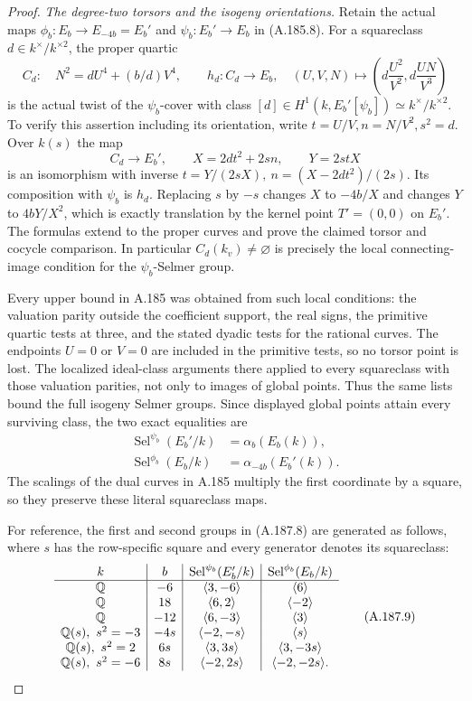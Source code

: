 \begin{proof}
\emph{The degree-two torsors and the isogeny orientations.}
Retain the actual maps
\(\phi_b:E_b\to E_{-4b}=E_b'\) and
\(\psi_b:E_b'\to E_b\) in (A.185.8).
For a squareclass \(d\in k^\times/k^{\times2}\), the
proper quartic
\[
 C_d:\quad N^2=dU^4+(b/d)V^4,
 \qquad
 h_d:C_d\longrightarrow E_b,
 \quad (U,V,N)\longmapsto
       \left(d\frac{U^2}{V^2},d\frac{UN}{V^3}\right)
\tag{A.187.6}
\]
is the actual twist of the \(\psi_b\)-cover with class
\([d]\in H^1(k,E_b'[\psi_b])\simeq k^\times/k^{\times2}\).
To verify this assertion including its orientation, write
\(t=U/V,n=N/V^2,s^2=d\).  Over \(k(s)\) the map
\[
 C_d\longrightarrow E_b',\qquad
 X=2dt^2+2sn,\qquad Y=2stX
\tag{A.187.7}
\]
is an isomorphism with inverse
\(t=Y/(2sX),\ n=(X-2dt^2)/(2s)\).
Its composition with \(\psi_b\) is \(h_d\).
Replacing \(s\) by \(-s\) changes \(X\) to
\(-4b/X\) and changes \(Y\) to \(4bY/X^2\),
which is exactly translation by the kernel point
\(T'=(0,0)\) on \(E_b'\).  The formulas extend to
the proper curves and prove the claimed torsor and cocycle
comparison.  In particular \(C_d(k_v)\ne\varnothing\)
is precisely the local connecting-image condition for
the \(\psi_b\)-Selmer group.

Every upper bound in A.185 was obtained from such local
conditions: the valuation parity outside the coefficient
support, the real signs, the primitive quartic tests at
three, and the stated dyadic tests for the rational curves.
The endpoints \(U=0\) or \(V=0\) are included in the
primitive tests, so no torsor point is lost.  The localized
ideal-class arguments there applied to every squareclass
with those valuation parities, not only to images of
global points.  Thus the same lists bound the full
isogeny Selmer groups.  Since displayed global points
attain every surviving class, the two exact equalities are
\[
\begin{aligned}
 \operatorname{Sel}^{\psi_b}(E_b'/k)
     &=\alpha_b(E_b(k)),\\
 \operatorname{Sel}^{\phi_b}(E_b/k)
     &=\alpha_{-4b}(E_b'(k)).
\end{aligned}
\tag{A.187.8}
\]
The scalings of the dual curves in A.185 multiply the
first coordinate by a square, so they preserve these
literal squareclass maps.

For reference, the first and second groups in (A.187.8)
are generated as follows, where \(s\) has the row-specific
square and every generator denotes its squareclass:
\[
\begin{array}{c|c|c|c}
k&b&\operatorname{Sel}^{\psi_b}(E_b'/k)
       &\operatorname{Sel}^{\phi_b}(E_b/k)\\ \hline
\mathbb Q&-6&\langle3,-6\rangle&\langle6\rangle\\
\mathbb Q&18&\langle6,2\rangle&\langle-2\rangle\\
\mathbb Q&-12&\langle6,-3\rangle&\langle3\rangle\\
\mathbb Q(s),\ s^2=-3&-4s&\langle-2,-s\rangle&\langle s\rangle\\
\mathbb Q(s),\ s^2=2&6s&\langle3,3s\rangle&\langle3,-3s\rangle\\
\mathbb Q(s),\ s^2=-6&8s&\langle-2,2s\rangle&\langle-2,-2s\rangle.
\end{array}
\tag{A.187.9}
\]


\end{proof}
